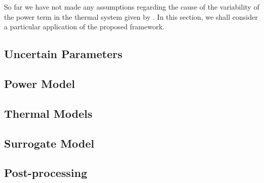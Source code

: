 
So far we have not made any assumptions regarding the cause of the variability of the power term in the thermal system given by .
In this section, we shall consider a particular application of the proposed framework.



\subsection{Uncertain Parameters} 


\subsection{Power Model} 


\subsection{Thermal Models} 


\subsection{Surrogate Model} 


\subsection{Post-processing} 

